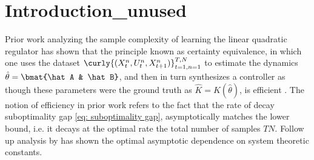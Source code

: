 \section{Introduction_unused}

\sloppy 
Prior work analyzing the sample complexity of learning the linear quadratic regulator has shown that the principle known as certainty equivalence, in which one uses the dataset $\curly{(X_t^n, U_t^n, X_{t+1}^n)}_{t=1, n=1}^{T,N}$ to estimate the dynamics $\hat\theta = \bmat{\hat A & \hat B}$, and then in turn synthesizes a controller as though these parameters were the ground truth as $\hat K = K(\hat \theta)$, 
is efficient \citep{mania2019certainty}.  The notion of efficiency in prior work refers to the fact that the rate of decay suboptimality gap \eqref{eq: suboptimality gap}, asymptotically matches the lower bound, i.e. it decays at the optimal rate the total number of samples $TN$. Follow up analysis by \citet{wagenmaker2021task, lee2024active} has shown the optimal asymptotic dependence on system theoretic constants. 

